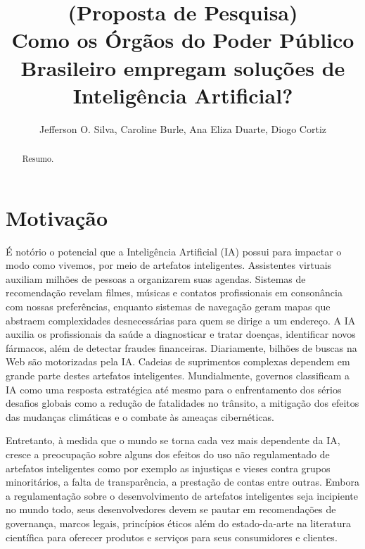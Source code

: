 \documentclass[12pt]{article}
\title{(Proposta de Pesquisa) \\ Como os Órgãos do Poder Público Brasileiro empregam soluções de Inteligência Artificial?}
\author{Jefferson O. Silva\inst{1}, Caroline Burle\inst{1}, Ana Eliza Duarte\inst{1}, Diogo Cortiz\inst{1} }
\begin{document}
 

\maketitle



\begin{abstract}
Resumo.
\end{abstract}





\section{Motivação}

É notório o potencial que a Inteligência Artificial (IA) possui para impactar o modo como vivemos, por meio de artefatos inteligentes. Assistentes virtuais auxiliam milhões de pessoas a organizarem suas agendas. Sistemas de recomendação revelam filmes, músicas e contatos profissionais em consonância com nossas preferências, enquanto sistemas de navegação geram mapas que abstraem complexidades desnecessárias para quem se dirige a um endereço. A IA auxilia os profissionais da saúde a diagnosticar e tratar doenças, identificar novos fármacos, além de detectar fraudes financeiras. Diariamente, bilhões de buscas na Web são motorizadas pela IA. Cadeias de suprimentos complexas dependem em grande parte destes artefatos inteligentes. Mundialmente, governos classificam a IA como uma resposta estratégica até mesmo para o enfrentamento dos sérios desafios globais como a redução de fatalidades no trânsito, a mitigação dos efeitos das mudanças climáticas e o combate às ameaças cibernéticas.

 Entretanto, à medida que o mundo se torna cada vez mais dependente da IA, cresce a preocupação sobre alguns dos efeitos do uso não regulamentado de artefatos inteligentes como por exemplo as injustiças e vieses contra grupos minoritários, a falta de transparência, a prestação de contas entre outras. Embora a regulamentação sobre o desenvolvimento de artefatos inteligentes seja incipiente no mundo todo, seus desenvolvedores devem se pautar em recomendações de governança, marcos legais, princípios éticos além do estado-da-arte na literatura científica para oferecer produtos e serviços para seus consumidores e clientes. 
\end{document}
